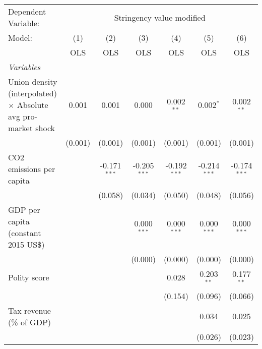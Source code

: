 
\begingroup
\centering
\begin{tabular}{lcccccc}
   \toprule
   Dependent Variable: & \multicolumn{6}{c}{Stringency value modified}\\
   Model:                                                               & (1)     & (2)            & (3)            & (4)            & (5)            & (6)\\  
                                                                        &  OLS    & OLS            & OLS            & OLS            & OLS            & OLS\\  
   \midrule
   \emph{Variables}\\
   Union density (interpolated) $\times$ Absolute avg pro-market shock  & 0.001   & 0.001          & 0.000          & 0.002$^{**}$   & 0.002$^{*}$    & 0.002$^{**}$\\   
                                                                        & (0.001) & (0.001)        & (0.001)        & (0.001)        & (0.001)        & (0.001)\\   
   CO2 emissions per capita                                             &         & -0.171$^{***}$ & -0.205$^{***}$ & -0.192$^{***}$ & -0.214$^{***}$ & -0.174$^{***}$\\   
                                                                        &         & (0.058)        & (0.034)        & (0.050)        & (0.048)        & (0.056)\\   
   GDP per capita (constant 2015 US\$)                                  &         &                & 0.000$^{***}$  & 0.000$^{***}$  & 0.000$^{***}$  & 0.000$^{***}$\\   
                                                                        &         &                & (0.000)        & (0.000)        & (0.000)        & (0.000)\\   
   Polity score                                                         &         &                &                & 0.028          & 0.203$^{**}$   & 0.177$^{**}$\\   
                                                                        &         &                &                & (0.154)        & (0.096)        & (0.066)\\   
   Tax revenue (\% of GDP)                                              &         &                &                &                & 0.034          & 0.025\\   
                                                                        &         &                &                &                & (0.026)        & (0.023)\\   

\end{tabular}
